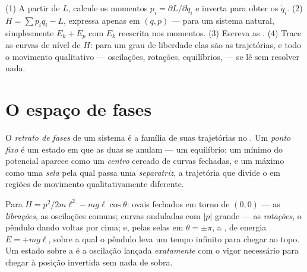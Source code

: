 \begin{method}\label{met:b3:hamiltonian-mechanics:recipe}
(1) A partir de $L$, calcule os momentos $p_i = \partial L/\partial\dot q_i$
e inverta para obter os $\dot q_i$. (2) $H = \sum p_i\dot q_i - L$,
expressa apenas em $(q, p)$ --- para um sistema natural, simplesmente
$E_k + E_p$ com $E_k$ reescrita nos momentos. (3) Escreva as . (4) Trace as curvas de nível de $H$: para um grau de
liberdade elas são as trajetórias, e todo o movimento qualitativo ---
oscilações, rotações, equilíbrios,  --- se lê sem resolver
nada.
\end{method}

\section{O espaço de fases}

\begin{definition}\label{def:b3:hamiltonian-mechanics:portrait}
O \emph{retrato de fases} de um sistema é a família de suas
trajetórias no . Um \emph{ponto fixo} é um estado em que
as duas  se anulam --- um equilíbrio: um mínimo do
potencial aparece como um \emph{centro} cercado de curvas fechadas, e
um máximo como uma \emph{sela} pela qual passa uma \emph{separatriz}, a
trajetória que divide o  em regiões de movimento
qualitativamente diferente.
\end{definition}

\begin{example}\label{ex:b3:hamiltonian-mechanics:pendulum-portrait}
Para $H = p^2/2m\ell^2 - mg\ell\cos\theta$: ovais fechados em torno de
$(0, 0)$ --- as \emph{librações}, as oscilações comuns; curvas
onduladas com $|p|$ grande --- as \emph{rotações}, o pêndulo dando
voltas por cima; e, pelas selas em $\theta = \pm\pi$, a , de
energia $E = +mg\ell$, sobre a qual o pêndulo leva um tempo infinito
para chegar ao topo. Um estado sobre a  é a oscilação lançada
\emph{exatamente} com o vigor necessário para chegar à posição
invertida sem nada de sobra.
\end{example}

